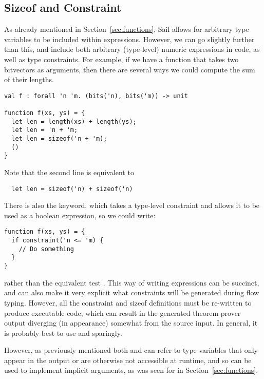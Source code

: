 

\subsection{Sizeof and Constraint}
\label{sec:sizeof}

As already mentioned in Section~\ref{sec:functions}, Sail allows for
arbitrary type variables to be included within expressions. However,
we can go slightly further than this, and include both arbitrary
(type-level) numeric expressions in code, as well as type
constraints. For example, if we have a function that takes two
bitvectors as arguments, then there are several ways we could compute
the sum of their lengths.
\begin{lstlisting}
val f : forall 'n 'm. (bits('n), bits('m)) -> unit

function f(xs, ys) = {
  let len = length(xs) + length(ys);
  let len = 'n + 'm;
  let len = sizeof('n + 'm);
  ()
}
\end{lstlisting}
Note that the second line is equivalent to
\begin{lstlisting}
  let len = sizeof('n) + sizeof('n)
\end{lstlisting}

There is also the  keyword, which takes a type-level constraint and allows it to be used as a boolean expression, so we could write:
\begin{lstlisting}
function f(xs, ys) = {
  if constraint('n <= 'm) {
    // Do something
  }
}
\end{lstlisting}
rather than the equivalent test . This way
of writing expressions can be succinct, and can also make it very
explicit what constraints will be generated during flow
typing. However, all the constraint and sizeof definitions must be
re-written to produce executable code, which can result in the
generated theorem prover output diverging (in appearance) somewhat
from the source input. In general, it is probably best to use
 and  sparingly.

However, as previously mentioned both  and 
can refer to type variables that only appear in the output or are
otherwise not accessible at runtime, and so can be used to implement
implicit arguments, as was seen for  in
Section~\ref{sec:functions}.

